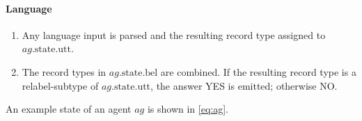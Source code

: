 \paragraph{Language}

\begin{enumerate}
\item Any language input is parsed and the resulting record type assigned to $ag.\text{state.utt}$.
\item The record types in $ag.\text{state.bel}$ are combined. If the resulting record type is a relabel-subtype of $ag.\text{state.utt}$, the answer YES is emitted; otherwise NO.
\end{enumerate}



An example state of an agent $ag$ is shown in \autoref{eq:ag}.

